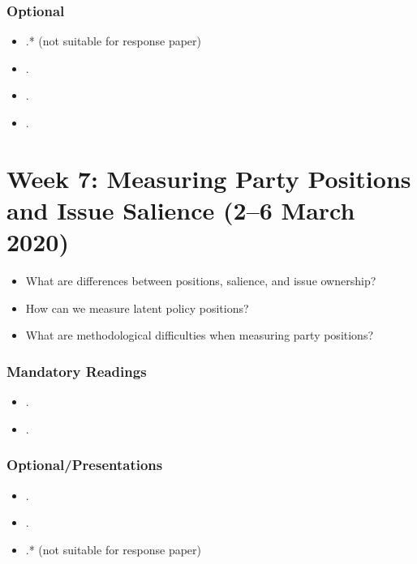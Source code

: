 \documentclass[abstract=on,parskip=full,headings=standardclasses,fontsize=11pt,paper=a4]{scrartcl}
\begin{document}
\subsubsection*{Optional}
\begin{itemize}
\item {}.* (not suitable for response paper)
\item {}.
\item {}.
\item {}.
\end{itemize}




\section{Week 7:   Measuring Party Positions and Issue Salience (2--6 March 2020)}


\begin{itemize}
\renewcommand\labelitemi{--}
\item What are differences between positions, salience, and issue ownership?
\item How can we measure latent policy positions? 
\item What are methodological difficulties when measuring party positions?
\end{itemize}

\subsubsection*{Mandatory Readings}
\begin{itemize}
\item {}.
\item {}.
\end{itemize}


\subsubsection*{Optional/Presentations}
\begin{itemize}
\item {}.
\item {}.
\item {}.*  (not suitable for response paper)
\end{itemize}


\end{document}
